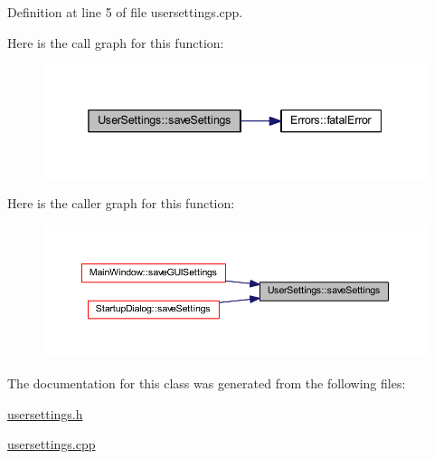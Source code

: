 Definition at line 5 of file usersettings.\+cpp.

Here is the call graph for this function\+:
\nopagebreak
\begin{figure}[H]
\begin{center}
\leavevmode
\includegraphics[width=338pt]{class_user_settings_a0ec1a38cad81b92041d4024a4862c738_cgraph}
\end{center}
\end{figure}
Here is the caller graph for this function\+:
\nopagebreak
\begin{figure}[H]
\begin{center}
\leavevmode
\includegraphics[width=350pt]{class_user_settings_a0ec1a38cad81b92041d4024a4862c738_icgraph}
\end{center}
\end{figure}


The documentation for this class was generated from the following files\+:\begin{DoxyCompactItemize}
\item 
\mbox{\hyperlink{usersettings_8h}{usersettings.\+h}}\item 
\mbox{\hyperlink{usersettings_8cpp}{usersettings.\+cpp}}\end{DoxyCompactItemize}
